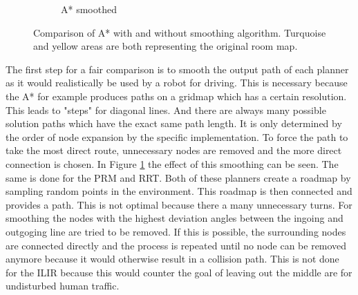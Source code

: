 \begin{figure}[h]
\begin{subfigure}{.24\textwidth}
      \caption{A* smoothed}
    \end{subfigure}
    \caption[Comparison of A* with and without smoothing algorithm]{Comparison of A* with and without smoothing algorithm. Turquoise and yellow areas are both representing the original room map.}
    \label{fig:smoothing}
\end{figure}

The first step for a fair comparison is to smooth the output path of each planner as it would realistically be used by a robot for driving. This is necessary because the A* for example produces paths on a gridmap which has a certain resolution. This leads to "steps" for diagonal lines. And there are always many possible solution paths which have the exact same path length. It is only determined by the order of node expansion by the specific implementation. To force the path to take the most direct route, unnecessary nodes are removed and the more direct connection is chosen. In Figure \ref{fig:smoothing} the effect of this smoothing can be seen. The same is done for the PRM and RRT. Both of these planners create a roadmap by sampling random points in the environment. This roadmap is then connected and provides a path. This is not optimal because there a many unnecessary turns. For smoothing the nodes with the highest deviation angles between the ingoing and outgoging line are tried to be removed. If this is possible, the surrounding nodes are connected directly and the process is repeated until no node can be removed anymore because it would otherwise result in a collision path. This is not done for the ILIR because this would counter the goal of leaving out the middle are for undisturbed human traffic.

